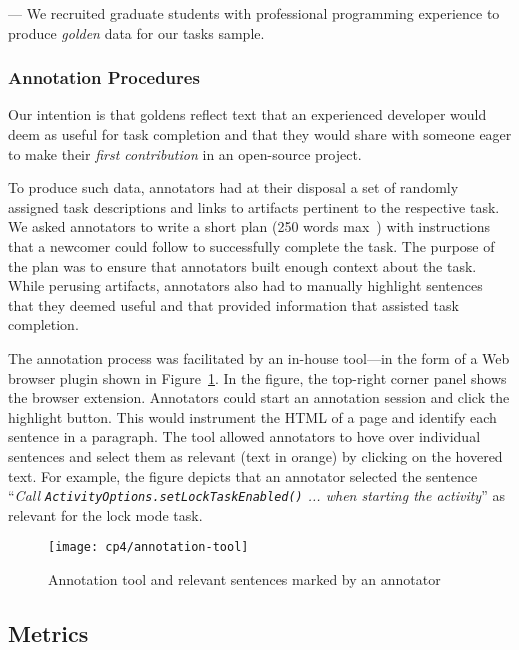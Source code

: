 --- We recruited  graduate students with professional programming experience to produce \textit{golden} data for our tasks sample. \vspace{3mm}


\subsubsection{Annotation Procedures}

Our intention is that goldens reflect text that an experienced developer would deem as useful for task completion and that they would share with someone eager to make their \textit{first contribution} in an open-source project.


To produce such data, annotators had at their disposal a set of randomly assigned task descriptions and links to artifacts pertinent to the respective task. We asked annotators to write a short plan (250 words max~\cite{Rastkar2010}) with instructions that a newcomer could follow to successfully complete the task. 
The purpose of the plan was to ensure that annotators built enough context about the task.
While perusing artifacts, annotators also had to manually highlight sentences that they deemed useful and that provided information that assisted task completion. 


The annotation process was facilitated by an in-house tool---in the form of a Web browser plugin shown in Figure~\ref{fig:corpus-annotation-tool}. In the figure, the top-right corner panel shows the browser extension. Annotators could start an annotation session and click the highlight button.
This would instrument the HTML of a page and identify each sentence in a paragraph. The tool allowed annotators to hove over individual sentences and select them as relevant (text in orange) by clicking on the hovered text. For example, the figure depicts that an annotator selected  the sentence
``\textit{Call {\small \texttt{ActivityOptions.setLockTaskEnabled()}} ... when starting the activity}'' as relevant for the lock mode task.


\begin{figure}
    \centering
    \texttt{[image: cp4/annotation-tool]}
    \caption{Annotation tool and relevant sentences marked by an annotator}
    \label{fig:corpus-annotation-tool}
\end{figure}



\subsection{Metrics}


